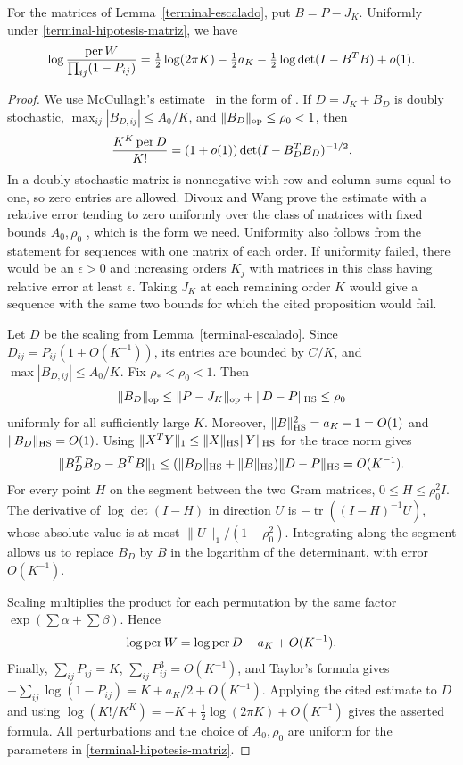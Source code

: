 \begin{proposicion}\label{terminal-permanente}
For the matrices of Lemma~\ref{terminal-escalado}, put $B=P-J_K$. Uniformly under
\eqref{terminal-hipotesis-matriz}, we have
\[
 \log\frac{\operatorname{per} W}{\prod_{ij}(1-P_{ij})}
 =\tfrac12\log(2\pi K)-\tfrac12a_K
   -\tfrac12\log\det(I-B^TB)+o(1).
\]
\end{proposicion}
\begin{proof}
We use McCullagh's estimate~\cite{mccullagh} in the form of \cite[Proposition~3.1]{dw}. If
$D=J_K+B_D$ is doubly stochastic, $\max_{ij}|B_{D,ij}|\le A_0/K$, and $\|B_D\|_{\rm op}\le\rho_0<1$,
then
\[
 \frac{K^K\operatorname{per} D}{K!}=(1+o(1))\det(I-B_D^TB_D)^{-1/2}.
\]
In \cite[Section~2.1]{dw} a doubly stochastic matrix is nonnegative with row and column sums
equal to one, so zero entries are allowed. Divoux and Wang prove the estimate with a relative
error tending to zero uniformly over the class of matrices with fixed bounds $A_0,\rho_0$
\cite[Remark~2.1]{dw}, which is the form we need. Uniformity also follows from the statement
for sequences with one matrix of each order. If uniformity failed, there would be an $\epsilon>0$
and increasing orders $K_j$ with matrices in this class having relative error at least $\epsilon$.
Taking $J_K$ at each remaining order $K$ would give a sequence with the same two bounds for which
the cited proposition would fail.

Let $D$ be the scaling from Lemma~\ref{terminal-escalado}. Since $D_{ij}=P_{ij}(1+O(K^{-1}))$,
its entries are bounded by $C/K$, and $\max|B_{D,ij}|\le A_0/K$. Fix $\rho_*<\rho_0<1$. Then
\[
 \|B_D\|_{\rm op}\le\|P-J_K\|_{\rm op}+\|D-P\|_{\rm HS}
       \le\rho_0
\]
uniformly for all sufficiently large $K$. Moreover, $\|B\|_{\rm HS}^2=a_K-1=O(1)$ and
$\|B_D\|_{\rm HS}=O(1)$. Using $\|X^TY\|_1\le\|X\|_{\rm HS}\|Y\|_{\rm HS}$ for the trace norm gives
\[
 \|B_D^TB_D-B^TB\|_1
 \le(\|B_D\|_{\rm HS}+\|B\|_{\rm HS})\|D-P\|_{\rm HS}
 =O(K^{-1}).
\]
For every point $H$ on the segment between the two Gram matrices, $0\le H\le\rho_0^2I$. The
derivative of $\log\det(I-H)$ in direction $U$ is $-\operatorname{tr}((I-H)^{-1}U)$, whose
absolute value is at most $\|U\|_1/(1-\rho_0^2)$. Integrating along the segment allows us to
replace $B_D$ by $B$ in the logarithm of the determinant, with error $O(K^{-1})$.

Scaling multiplies the product for each permutation by the same factor $\exp(\sum\alpha+\sum\beta)$.
Hence
\[
 \log\operatorname{per} W=\log\operatorname{per} D-a_K+O(K^{-1}).
\]
Finally, $\sum_{ij}P_{ij}=K$, $\sum_{ij}P_{ij}^3=O(K^{-1})$, and Taylor's formula gives
$-\sum_{ij}\log(1-P_{ij})=K+a_K/2+O(K^{-1})$. Applying the cited estimate to $D$ and using
$\log(K!/K^K)=-K+\tfrac12\log(2\pi K)+O(K^{-1})$ gives the asserted formula. All perturbations
and the choice of $A_0,\rho_0$ are uniform for the parameters in \eqref{terminal-hipotesis-matriz}.
\end{proof}

